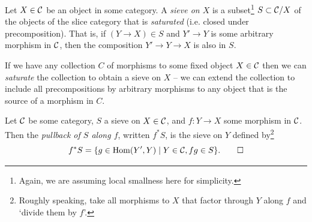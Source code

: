         \begin{definition}
            Let $X\in\mathcal{C}$ be an object in some category.
            A \emph{sieve on $X$} is a subset\footnote{
                Again, we are assuming local smallness here for simplicity.
            } $S\subset \mathcal{C}/X$ of the objects of the slice category that is \emph{saturated} (i.e. closed under precomposition).
            That is, if $(Y\to X)\in S$ and $Y'\to Y$ is some arbitrary morphism in $\mathcal{C}$, then the composition $Y'\to Y\to X$ is also in $S$.
        \end{definition}

        If we have any collection $C$ of morphisms to some fixed object $X\in\mathcal{C}$ then we can \emph{saturate} the collection to obtain a sieve on $X$ -- we can extend the collection to include all precompositions by arbitrary morphisms to any object that is the source of a morphism in $C$.

        \begin{definition}\label{df:pullback-sieve}
            Let $\mathcal{C}$ be some category, $S$ a sieve on $X\in\mathcal{C}$, and $f\colon Y\to X$ some morphism in $\mathcal{C}$.
            Then the \emph{pullback of $S$ along $f$}, written $f^* S$, is the sieve on $Y$ defined by\footnote{
                Roughly speaking, take all morphisms to $X$ that factor through $Y$ along $f$ and `divide them by $f$'.
            }
            \begin{equation*}
                f^* S = \{g\in\operatorname{Hom}(Y', Y) \mid Y\in\mathcal{C},fg\in S\}.\qedhere
            \end{equation*}
        \end{definition}


